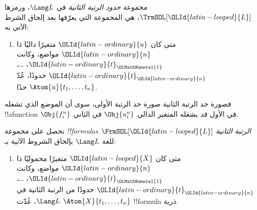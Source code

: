 \documentclass[../../../include/open-logic-section]{subfiles}
\begin{document}
\begin{defn}
مجموعة \emph{حدود الرتبة الثانية} في $\Lang L$، ورمزها
$\TrmSOL[{\OLId{latin-looped}{L}}]$، هي المجموعة التي يعرّفها
 بعد إلحاق الشرط الآتي به:
\begin{enumerate}
\item متى كان ${\OLId{latin-ordinary}{u}}$ متغيرًا داليًا ذا ${\OLId{latin-ordinary}{n}}$ مواضع،
وكانت ${\OLId{latin-ordinary}{t}}_{\OLMathNumeral{1}}$، \dots، ${\OLId{latin-ordinary}{t}}_{\OLId{latin-ordinary}{n}}$ حدودًا، عُدّ
$\Atom{u}{t_1, \ldots, t_n}$ حدًا.
\end{enumerate}
\end{defn}

\begin{explain}
فصورة حد الرتبة الثانية صورة حد الرتبة الأولى، سوى أن الموضع
الذي تشغله !!a{function} $\Obj{f^n_i}$ في الأول قد يشغله
المتغير الدالي $\Obj{u^n_i}$ في الثاني.
\end{explain}

\begin{defn}
نحصل على مجموعة \emph{!!{formula}s الرتبة الثانية}
$\FrmSOL[{\OLId{latin-looped}{L}}]$ للغة $\Lang L$ بإلحاق الشروط الآتية
بـ:
\begin{enumerate}
\item متى كان ${\OLId{latin-looped}{X}}$ متغيرًا محموليًا ذا ${\OLId{latin-ordinary}{n}}$ مواضع،
وكانت ${\OLId{latin-ordinary}{t}}_{\OLMathNumeral{1}}$، \dots، ${\OLId{latin-ordinary}{t}}_{\OLId{latin-ordinary}{n}}$ حدودًا من الرتبة الثانية في
$\Lang L$، عُدّت $\Atom{X}{t_1,\ldots, t_n}$ !!{formula} ذرية.




\end{enumerate}
\end{defn}
\end{document}
